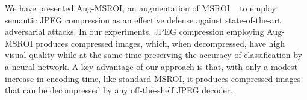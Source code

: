 
We have presented Aug-MSROI, an augmentation of MSROI ~\cite{Prakash2017SemanticPI}  to employ semantic JPEG compression as an effective defense against state-of-the-art adversarial attacks.
In our experiments, JPEG compression employing Aug-MSROI produces compressed images, which, when decompressed, have high visual quality while at the same time preserving the accuracy of classification by a neural network. 
A key advantage of our approach is that, with only a modest increase in encoding time, like standard MSROI, it produces compressed images that can be decompressed by any off-the-shelf JPEG decoder.
